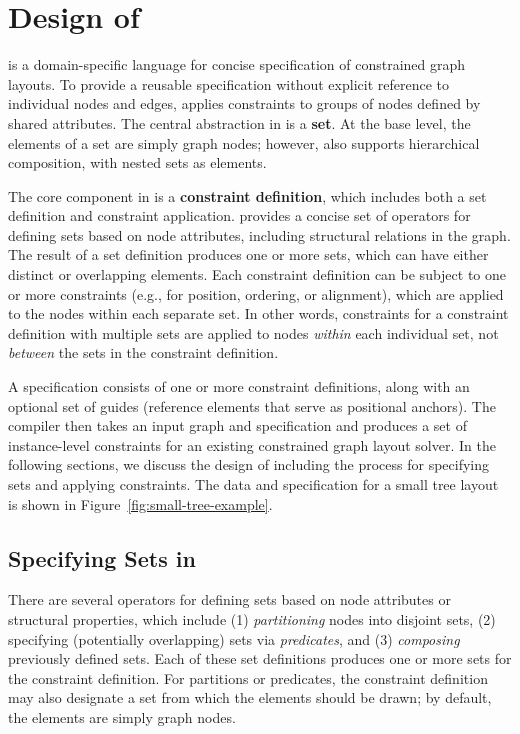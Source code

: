 \section{Design of \projectname}
\projectname is a domain-specific language for concise specification of 
constrained graph layouts. To provide a reusable specification 
without explicit reference to individual nodes and edges, \projectname
applies constraints to groups of nodes defined by shared attributes. 
The central abstraction in \projectname is a \textbf{set}. At the base level, 
the elements of a set are simply graph nodes; however, \projectname also
supports hierarchical composition, with nested sets as elements.

The core component in \projectname is a \textbf{constraint definition},
which includes both a set definition and constraint application.
\projectname provides a concise set of operators for defining
sets based on node attributes, including structural relations in the graph.
The result of a set definition produces one or more sets, which 
can have either distinct or overlapping elements. Each constraint definition can 
be subject to one or more constraints (e.g., for position, ordering, 
or alignment), which are applied to the nodes within each separate set. 
In other words, constraints for a constraint definition with multiple sets are 
applied to nodes \emph{within} each individual set, not \emph{between} 
the sets in the constraint definition.

A \projectname specification consists of one or more constraint definitions, 
along with an optional set of guides (reference elements that serve as 
positional anchors). The \projectname compiler then takes an input graph 
and specification and produces a set of instance-level constraints for 
an existing constrained graph layout solver. In the following sections, 
we discuss the design of \projectname including the process for 
specifying sets and applying constraints. The data and \projectname 
specification for a small tree layout is shown in Figure~\ref{fig:small-tree-example}.

\smallTreeExample

\subsection{Specifying Sets in \projectname}
There are several operators for defining sets based on node attributes 
or structural properties, which include (1) \emph{partitioning} nodes 
into disjoint sets, (2) specifying (potentially overlapping) sets via
\emph{predicates},
and (3) \emph{composing} previously defined sets. Each of these set
definitions produces one or more sets for the constraint definition. For
partitions or predicates, the constraint definition may also 
designate a set from which the elements should be drawn; by default, the
elements are simply graph nodes.

